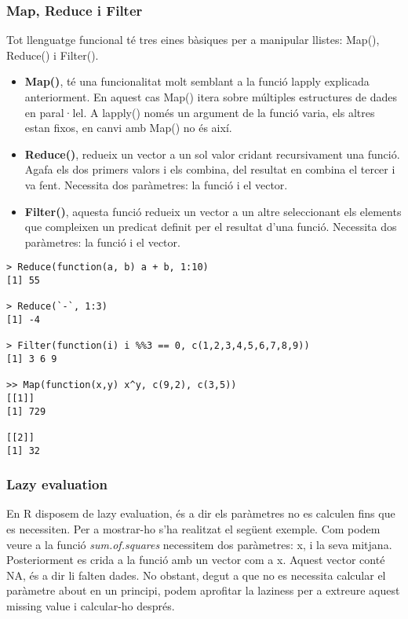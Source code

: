 \documentclass[12pt]{article}
\begin{document}
\medskip
\subsubsection{Map, Reduce i Filter}
Tot llenguatge funcional té tres eines bàsiques per a manipular llistes: Map(), Reduce() i Filter().
\begin{itemize}
\item \textbf{Map()}, té una funcionalitat molt semblant a la funció lapply explicada anteriorment. En aquest cas Map() itera sobre múltiples estructures de dades en paral·lel. A lapply() només un argument de la funció varia, els altres estan fixos, en canvi amb Map() no és així. 

\item \textbf{Reduce()}, redueix un vector a un sol valor cridant recursivament una funció. Agafa els dos primers valors i els combina, del resultat en combina el tercer i va fent. Necessita dos paràmetres: la funció i el vector.

\item \textbf{Filter()}, aquesta funció redueix un vector a un altre seleccionant els elements que compleixen un predicat definit per el resultat d'una funció. Necessita dos paràmetres: la funció i el vector. 

\end{itemize} 
\begin{verbatim}
> Reduce(function(a, b) a + b, 1:10)
[1] 55

> Reduce(`-`, 1:3)
[1] -4

> Filter(function(i) i %%3 == 0, c(1,2,3,4,5,6,7,8,9))
[1] 3 6 9

>> Map(function(x,y) x^y, c(9,2), c(3,5))
[[1]]
[1] 729

[[2]]
[1] 32

\end{verbatim}

\medskip
\subsubsection{Lazy evaluation} 
En R disposem de lazy evaluation, és a dir els paràmetres no es calculen fins que es necessiten. Per a mostrar-ho s'ha realitzat el següent exemple. Com podem veure a la funció \textit{sum.of.squares} necessitem dos paràmetres: x, i la seva mitjana. Posteriorment es crida a la funció amb un vector com a x. Aquest vector conté NA, és a dir li falten dades. No obstant, degut a que no es necessita calcular el paràmetre about en un principi, podem aprofitar la laziness per a extreure aquest missing value i calcular-ho després. 
\end{document}
